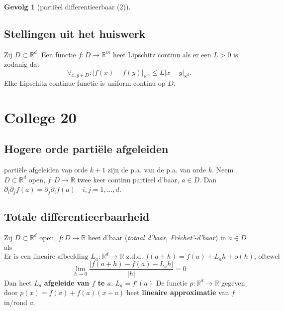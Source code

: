 \documentclass[a4paper]{exam}
\theoremstyle{definition}
\newtheorem*{gevolg}{Gevolg}
\newcommand{\reals}{\mathbb{R}}
\begin{document}
\begin{gevolg}[parti\"eel differentieerbaar (2)]
\end{gevolg}



        \subsection{Stellingen uit het huiswerk}
			\theorem Zij $D \subset \reals^d$. Een functie $f:D \rightarrow \reals^m$ heet Lipschitz continu als er een $L>0$ is zodanig dat
            \[\forall _{x,y \in D}: |f(x)-f(y)|_{\reals^m} \leq L|x-y|_{\reals^d}.\]
            Elke Lipschitz continue functie is uniform continu op $D$.
    \newpage
    \section{College 20}
        \subsection{Hogere orde parti\"ele afgeleiden}
             parti\"ele afgeleiden van orde $k+1$ zijn de p.a. van de p.a. van orde $k$.
             Neem $D \subset \reals^d$ open, $f:D \rightarrow \reals$ twee keer continu partieel d'baar, $a \in D$. Dan $\partial_i \partial_j f(a) = \partial_j \partial_i f(a) \quad i,j=1,\dots ,d$.
        \subsection{Totale differentieerbaarheid}
             Zij $D \subset \reals^d$ open, $f:D \rightarrow \reals$ heet d'baar (\textit{totaal d'baar, Fr\`echet'-d'baar}) in $a \in D$ als
            \[\text{Er is een lineaire afbeelding } L_a:\reals^d \rightarrow \reals \text{ z.d.d. } f(a+h)=f(a)+L_a h +\mathrm{o}(h)\text{, oftewel}\]
            \[\lim_{h \rightarrow 0}\frac{|f(a+h)-f(a)-L_a h|}{|h|} = 0\]
            Dan heet $L_a$ \textbf{afgeleide van $f$ te $a$}.
            \nota $L_a = f'(a)$
             De functie $ p: \reals^d \rightarrow \reals $ gegeven door $ p(x)=f(a)+f(a)(x-a) $ heet \textbf{lineaire approximatie} van $ f $ in/rond $ a $.
\end{document}
